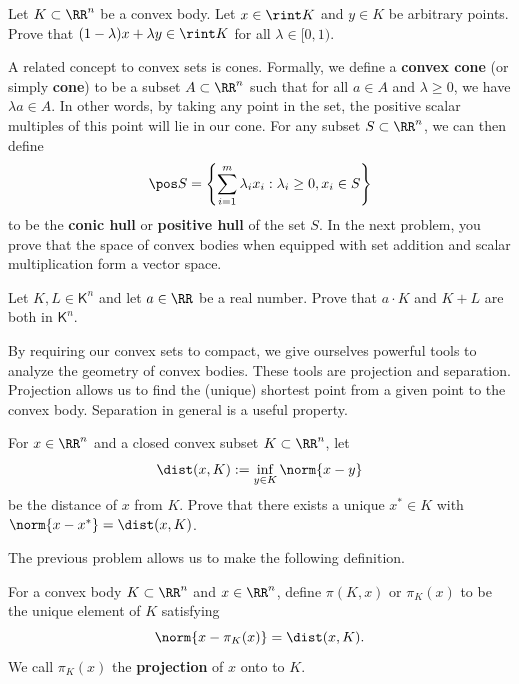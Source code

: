 \documentclass[11pt]{article}
\begin{document}
\begin{prob} [15 points]
    Let $K \subset \RR^n$ be a convex body. Let $x \in \rint K$ and $y \in K$ be arbitrary points. Prove that $(1- \lambda) x + \lambda y \in \rint K$ for all $\lambda \in [0, 1)$.
\end{prob}

A related concept to convex sets is cones. Formally, we define a \textbf{convex cone} (or simply \textbf{cone}) to be a subset $A \subset \RR^n$ such that for all $a \in A$ and $\lambda \geq 0$, we have $\lambda a \in A$. In other words, by taking any point in the set, the positive scalar multiples of this point will lie in our cone. For any subset $S \subset \RR^n$, we can then define 
\[
    \pos S = \left \{ \sum_{i = 1}^m \lambda_i x_i : \lambda_i \geq 0 , x_i \in S \right \}
\]
to be the \textbf{conic hull} or \textbf{positive hull} of the set $S$. In the next problem, you prove that the space of convex bodies when equipped with set addition and scalar multiplication form a vector space. 

\begin{prob} [15 points] 
    Let $K, L \in \mathsf{K}^n$ and let $a \in \RR$ be a real number. Prove that $a \cdot K$ and $K + L$ are both in $\mathsf{K}^n$.  
\end{prob}

By requiring our convex sets to compact, we give ourselves powerful tools to analyze the geometry of convex bodies. These tools are projection and separation. Projection allows us to find the (unique) shortest point from a given point to the convex body. Separation in general is a useful property. 

\begin{prob} [15 points]
    For $x \in \RR^n$ and a closed convex subset $K \subset \RR^n$, let 
    \[
        \dist(x, K) := \inf_{y \in K} \norm{x-y}
    \]
    be the distance of $x$ from $K$. Prove that there exists a unique $x^* \in K$ with $\norm{x-x^*} = \dist(x, K)$.
\end{prob}

The previous problem allows us to make the following definition. 

\begin{defn}
    For a convex body $K \subset \RR^n$ and $x \in \RR^n$, define $\pi(K, x)$ or $\pi_K(x)$ to be the unique element of $K$ satisfying 
    \[
        \norm{x - \pi_K(x)} = \dist(x, K).   
    \]
    We call $\pi_K(x)$ the \textbf{projection} of $x$ onto to $K$. 
\end{defn} 
\end{document}
